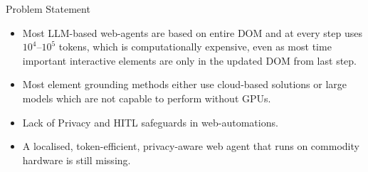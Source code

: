 \begin{frame}{Problem Statement}
  \begin{itemize}
    \item Most LLM-based web-agents are based on entire DOM and at every step uses $10^4$--$10^5$ tokens, which is computationally expensive, even as most time important interactive elements are only in the updated DOM from last step.
    \item Most element grounding methods either use cloud-based solutions or large models which are not capable to perform without GPUs.
    \item Lack of Privacy and HITL safeguards in web-automations.
    \item A localised, token-efficient, privacy-aware web agent that runs on commodity hardware is still missing.
  \end{itemize}
\end{frame}
